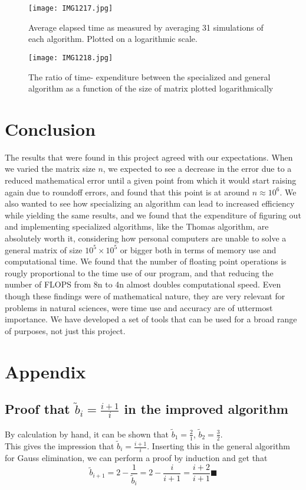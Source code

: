 \documentclass[10pt,a4paper]{article}
\begin{document}
\begin{center}
\begin{figure}[H]
\texttt{[image: IMG1217.jpg]} \label{Elapsed time comparison}
	\caption[Comparing elapsed time]{Average elapsed time as measured by averaging 31 simulations of each algorithm. Plotted on a logarithmic scale.}
\end{figure}
\end{center}
\begin{center}
\begin{figure}[H]
	\texttt{[image: IMG1218.jpg]}
	\caption[Comparing general and specialized (elapsed time)]{The ratio of time- expenditure between the specialized and general algorithm as a function of the size of matrix plotted logarithmically}
\end{figure}
\end{center}

\section{Conclusion}
The results that were found in this project agreed with our expectations. When we varied the matrix size $n$, we expected to see a decrease in the error due to a reduced mathematical error until a given point from which it would start raising again due to roundoff errors, and found that this point is at around $n \approx 10^6$. We also wanted to see how specializing an algorithm can lead to increased efficiency while yielding the same results, and we found that the expenditure of figuring out and implementing specialized algorithms, like the Thomas algorithm, are absolutely worth it, considering how personal computers are unable to solve a general matrix of size $10^5\times10^5$ or bigger both in terms of memory use and computational time. We found that the number of floating point operations is rougly proportional to the time use of our program, and that reducing the number of FLOPS from 8n to 4n almost doubles computational speed. Even though these findings were of mathematical nature, they are very relevant for problems in natural sciences, were time use and accuracy are of uttermost importance. We have developed a set of tools that can be used for a broad range of purposes, not just this project.
\section{Appendix}
\subsection{Proof that $\tilde{b}_i=\frac{i+1}{i}$ in the improved algorithm}
By calculation by hand, it can be shown that  $\tilde{b}_1=\frac{2}{1}$,  $\tilde{b}_2=\frac{3}{2}$.\\
This gives the impression that  $\tilde{b}_i=\frac{i+1}{i}$.
Inserting this in the general algorithm for Gauss elimination, we can perform a proof by induction and get that
 $$\tilde{b}_{i+1}=2-\frac{1}{\tilde{b}_{i}}=2-\frac{i}{i+1}=\frac{i+2}{i+1} \blacksquare$$
\end{document}
